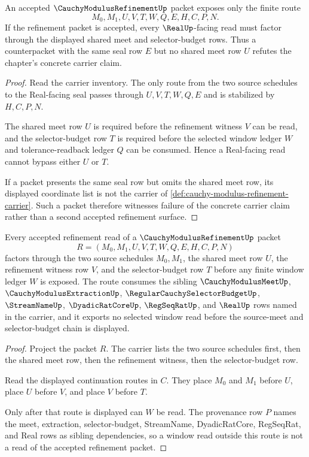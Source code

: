 \begin{theorem}
\label{thm:cauchy-modulus-refinement-nonescape}
An accepted $\CauchyModulusRefinementUp$ packet exposes only the finite route
$$
M_0,M_1,U,V,T,W,Q,E,H,C,P,N.
$$
If the refinement packet is accepted, every $\RealUp$-facing read must factor through the displayed shared meet and selector-budget rows. Thus a counterpacket with the same seal row $E$ but no shared meet row $U$ refutes the chapter's concrete carrier claim.
\end{theorem}
\begin{proof}
Read the carrier inventory. The only route from the two source schedules to the Real-facing seal passes through $U,V,T,W,Q,E$ and is stabilized by $H,C,P,N$.

The shared meet row $U$ is required before the refinement witness $V$ can be read, and the selector-budget row $T$ is required before the selected window ledger $W$ and tolerance-readback ledger $Q$ can be consumed. Hence a Real-facing read cannot bypass either $U$ or $T$.

If a packet presents the same seal row but omits the shared meet row, its displayed coordinate list is not the carrier of \autoref{def:cauchy-modulus-refinement-carrier}. Such a packet therefore witnesses failure of the concrete carrier claim rather than a second accepted refinement surface.
\end{proof}

\begin{theorem}
\label{thm:cauchy-modulus-refinement-source-meet-budget-chain}
Every accepted refinement read of a $\CauchyModulusRefinementUp$ packet
$$
R=(M_0,M_1,U,V,T,W,Q,E,H,C,P,N)
$$
factors through the two source schedules $M_0,M_1$, the shared meet row $U$, the refinement witness row $V$, and the selector-budget row $T$ before any finite window ledger $W$ is exposed. The route consumes the sibling $\CauchyModulusMeetUp$, $\CauchyModulusExtractionUp$, $\RegularCauchySelectorBudgetUp$, $\StreamNameUp$, $\DyadicRatCoreUp$, $\RegSeqRatUp$, and $\RealUp$ rows named in the carrier, and it exports no selected window read before the source-meet and selector-budget chain is displayed.
\end{theorem}
\begin{proof}
Project the packet $R$. The carrier lists the two source schedules first, then the shared meet row, then the refinement witness, then the selector-budget row.

Read the displayed continuation routes in $C$. They place $M_0$ and $M_1$ before $U$, place $U$ before $V$, and place $V$ before $T$.

Only after that route is displayed can $W$ be read. The provenance row $P$ names the meet, extraction, selector-budget, StreamName, DyadicRatCore, RegSeqRat, and Real rows as sibling dependencies, so a window read outside this route is not a read of the accepted refinement packet.
\end{proof}

